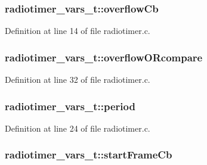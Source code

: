 \subsubsection[{\texorpdfstring{overflow\+Cb}{overflowCb}}]{ radiotimer\+\_\+vars\+\_\+t\+::overflow\+Cb}\hypertarget{structradiotimer__vars__t_a0ee5a190b5b75d3bb1fb7308aa52e78d}{}\label{structradiotimer__vars__t_a0ee5a190b5b75d3bb1fb7308aa52e78d}


Definition at line 14 of file radiotimer.\+c.

\subsubsection[{\texorpdfstring{overflow\+O\+Rcompare}{overflowORcompare}}]{ radiotimer\+\_\+vars\+\_\+t\+::overflow\+O\+Rcompare}\hypertarget{structradiotimer__vars__t_a101d4ae629d79ffa06f34946194a0316}{}\label{structradiotimer__vars__t_a101d4ae629d79ffa06f34946194a0316}


Definition at line 32 of file radiotimer.\+c.

\subsubsection[{\texorpdfstring{period}{period}}]{ radiotimer\+\_\+vars\+\_\+t\+::period}\hypertarget{structradiotimer__vars__t_a2dbe4b80aec79063b57f370128a75ece}{}\label{structradiotimer__vars__t_a2dbe4b80aec79063b57f370128a75ece}


Definition at line 24 of file radiotimer.\+c.

\subsubsection[{\texorpdfstring{start\+Frame\+Cb}{startFrameCb}}]{ radiotimer\+\_\+vars\+\_\+t\+::start\+Frame\+Cb}\hypertarget{structradiotimer__vars__t_a384be2c7f4649422003808180242d0a8}{}\label{structradiotimer__vars__t_a384be2c7f4649422003808180242d0a8}


